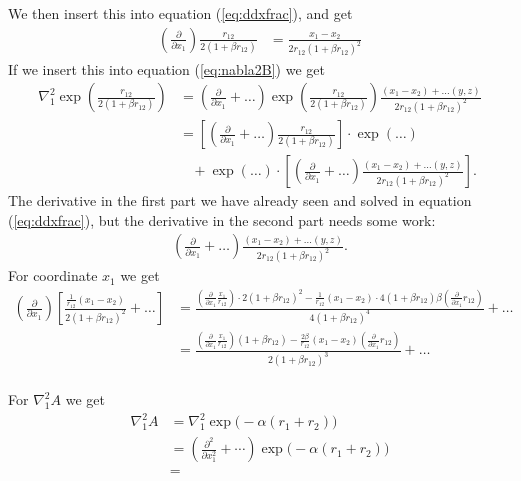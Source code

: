 We then insert this into equation (\ref{eq:ddxfrac}), and get
\begin{align*}
	\left(\frac{\partial}{\partial x_1}\right) \frac{r_{12}}{2(1 + \beta r_{12})}
	&= \frac{ x_1-x_2 }{2r_{12}(1 + \beta r_{12})^2 }
\end{align*}
If we insert this into equation (\ref{eq:nabla2B}) we get
\begin{align*}
	\nabla^2_1 \exp\left(\frac{r_{12}}{2(1 + \beta r_{12})}\right)
	&= \left(\frac{\partial}{\partial x_1} + \dots\right) \exp\left(\frac{r_{12}}{2(1 + \beta r_{12})}\right) \frac{ (x_1-x_2) + \dots(y,z) }{2r_{12}(1 + \beta r_{12})^2 } \\
	&= \left[\left(\frac{\partial}{\partial x_1}+\dots\right) \frac{r_{12}}{2(1 + \beta r_{12})}\right] \cdot \exp\left(\dots\right) \\
	&~~~~+ \exp(\dots) \cdot \left[\left(\frac{\partial}{\partial x_1}+\dots\right)\frac{ (x_1-x_2) + \dots(y,z) }{2r_{12}(1 + \beta r_{12})^2 }\right].
\end{align*}
The derivative in the first part we have already seen and solved in equation (\ref{eq:ddxfrac}), but the derivative in the second part needs some work:
\begin{align*}
	\left(\frac{\partial}{\partial x_1}+\dots\right)\frac{ (x_1-x_2) + \dots(y,z) }{2r_{12}(1 + \beta r_{12})^2 }.
\end{align*}
For coordinate $x_1$ we get
\begin{align*}
	\left(\frac{\partial}{\partial x_1}\right) \left[\frac{ {\displaystyle\frac{1}{r_{12}}}(x_1-x_2)}{2(1 + \beta r_{12})^2 }  + \dots\right]
	&= \frac{ \left(\frac{\partial}{\partial x_1}\frac{x_1}{r_{12}}\right) \cdot 2(1+\beta r_{12})^2 
	- \frac{1}{r_{12}}(x_1-x_2) \cdot 4(1 + \beta r_{12})\beta\left(\frac{\partial}{\partial x_1}r_{12}\right) } 
	{ 4(1+\beta r_{12})^4 } + \dots \\
	&= \frac{ \left(\frac{\partial}{\partial x_1}\frac{x_1}{r_{12}}\right) (1+\beta r_{12}) 
	- {\displaystyle\frac{2\beta}{r_{12}}}(x_1-x_2) \left(\frac{\partial}{\partial x_1}r_{12}\right) } 
	{ 2(1+\beta r_{12})^3 } + \dots \\
\end{align*}

For $\nabla^2_1A$ we get
\begin{align*}
	\nabla^2_1 A
	&= \nabla^2_1 \exp \Big(-\alpha(r_1+r_2)\Big) \\
	&= \left(\frac{\partial^2}{\partial x_1^2} + \cdots \right) \exp\Big(-\alpha(r_1+r_2)\Big) \\
	&= 
\end{align*}

